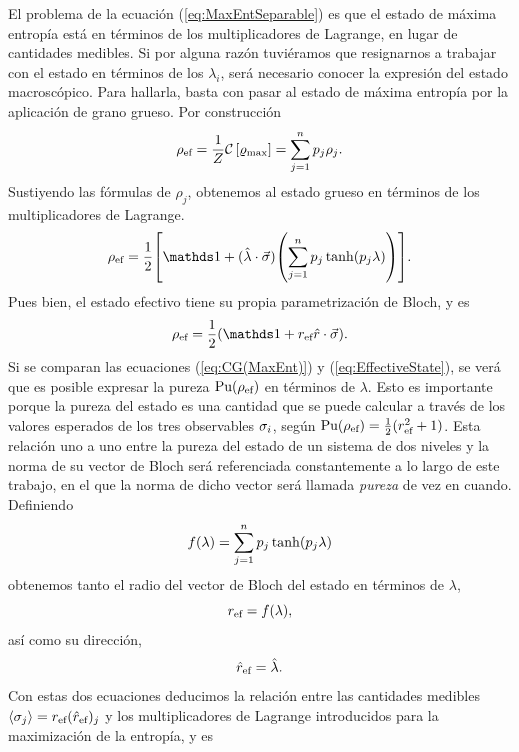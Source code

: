 El problema de la ecuación (\ref{eq:MaxEntSeparable}) es que el estado de máxima entropía está en términos de los multiplicadores de Lagrange, en lugar de cantidades medibles. Si por alguna razón tuviéramos que resignarnos a trabajar con el estado en términos de los $\lambda_{i}$, será necesario conocer la expresión del estado macroscópico. Para hallarla, basta con pasar al estado de máxima entropía por la aplicación de grano grueso. Por construcción 
\begin{equation}
    \rho_{\text{ef}}=\frac{1}{Z}\mathcal{C}\left[\varrho_{\max}\right]=\sum_{j=1}^{n}p_{j}\rho_{j}.\nonumber
\end{equation}
Sustiyendo las fórmulas de $\rho_{j}$, obtenemos al estado grueso en términos de los multiplicadores de Lagrange.
\begin{equation}\label{eq:CG(MaxEnt)}
    \rho_{\ef}=\frac{1}{2}\qty[\Id+(\paulivec{\lambda})\qty(\sum_{j=1}^{n}p_{j}\tanh(p_{j}\lambda))].
\end{equation}
Pues bien, el estado efectivo tiene su propia parametrización de Bloch, y es
\begin{equation}\label{eq:EffectiveState}
    \rho_{\ef}=\frac{1}{2}(\Id+r_{\ef}\paulivec{r}).
\end{equation}
Si se comparan las ecuaciones (\ref*{eq:CG(MaxEnt)}) y (\ref*{eq:EffectiveState}), se verá que es posible expresar la pureza $\text{Pu}(\rho_{\text{ef}})$ en términos de $\lambda$. Esto es importante porque la pureza del estado es una cantidad que se puede calcular a través de los valores esperados de los tres observables $\sigma_{i}$, según $\text{Pu}(\rho_{\text{ef}})=\frac{1}{2}(r_{\text{ef}}^{2}+1)$. Esta relación uno a uno entre la pureza del estado de un sistema de dos niveles y la norma de su vector de Bloch será referenciada constantemente a lo largo de este trabajo, en el que la norma de dicho vector será llamada \textit{pureza} de vez en cuando. Definiendo
\begin{equation}\label{eq:r(lambda)}
    f(\lambda)=\sum_{j=1}^{n}p_{j}\tanh(p_{j}\lambda)
\end{equation}
obtenemos tanto el radio del vector de Bloch del estado en términos de $\lambda$,
\begin{equation}
    r_{\text{ef}}=f(\lambda),\nonumber
\end{equation}
así como su dirección,
\begin{equation}
    \hat{r}_{\text{ef}}=\hat{\lambda}.\nonumber
\end{equation}
Con estas dos ecuaciones deducimos la relación entre las cantidades medibles $\expval{\sigma_{j}}=r_{\text{ef}}(\hat{r}_{\text{ef}})_{j}$ y los multiplicadores de Lagrange introducidos para la maximización de la entropía, y es
